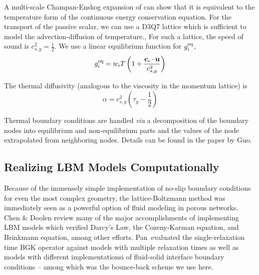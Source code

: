 A multi-scale Champan-Enskog expansion of  can show that it is equivalent to the temperature form of the continuous energy conservation equation.\cite{Guo2002} For the transport of the passive scalar, we can use a D3Q7 lattice which is sufficient to model the advection-diffusion of temperature.\cite{Latt2007,Parmigiani2011}, For such a lattice, the speed of sound is $c^2_{s,g} = \frac{1}{2}$. We use a linear equilibrium function for $g_i^{\text{eq}}$,
\begin{equation}
	g_i^{\text{eq}} = w_i T \left(1+\frac{\mathbf{c}_i\cdot\mathbf{u}}{c_{s,g}^2}\right)
\end{equation}

The thermal diffusivity (analogous to the viscosity in the momentum lattice) is 
\begin{equation}
	\alpha = c_{s,g}^2\left(\tau_{g} - \frac{1}{2}\right)
\end{equation}

Thermal boundary conditions are handled \textit{via} a decomposition of the boundary nodes into equilibrium and non-equilibrium parts and the values of the node extrapolated from neighboring nodes. Details can be found in the paper by Guo\etal.\cite{Guo2002}


\subsection{Realizing LBM Models Computationally}
Because of the immensely simple implementation of no-slip boundary conditions for even the most complex geometry, the lattice-Boltzmann method was immediately seen as a powerful option of fluid modeling in porous networks. Chen \& Doolen review many of the major accomplishments of implementing LBM models which verified Darcy's Law, the Cozeny-Karman equation, and Brinkmann equation, among other efforts.\cite{Chen1998a} Pan\etal~evaluated the single-relaxation time BGK operator against models with multiple relaxation times as well as models with different implementationsi of fluid-solid interface boundary conditions -- among which was the bounce-back scheme we use here.\cite{Pan2006}

